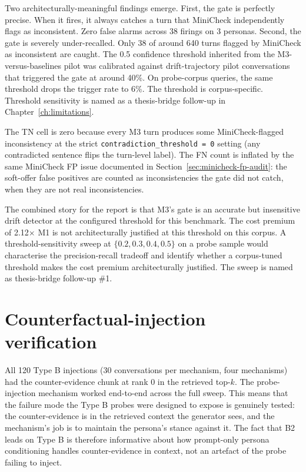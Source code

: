 Two architecturally-meaningful findings emerge. First, the gate is perfectly precise. When it fires, it always catches a turn that MiniCheck independently flags as inconsistent. Zero false alarms across 38 firings on 3 personas. Second, the gate is severely under-recalled. Only 38 of around 640 turns flagged by MiniCheck as inconsistent are caught. The 0.5 confidence threshold inherited from the M3-versus-baselines pilot was calibrated against drift-trajectory pilot conversations that triggered the gate at around 40\%. On probe-corpus queries, the same threshold drops the trigger rate to 6\%. The threshold is corpus-specific. Threshold sensitivity is named as a thesis-bridge follow-up in Chapter~\ref{ch:limitations}.

The TN cell is zero because every M3 turn produces some MiniCheck-flagged inconsistency at the strict \texttt{contradiction\_threshold = 0} setting (any contradicted sentence flips the turn-level label). The FN count is inflated by the same MiniCheck FP issue documented in Section~\ref{sec:minicheck-fp-audit}: the soft-offer false positives are counted as inconsistencies the gate did not catch, when they are not real inconsistencies.

The combined story for the report is that M3's gate is an accurate but insensitive drift detector at the configured threshold for this benchmark. The cost premium of 2.12$\times$ M1 is not architecturally justified at this threshold on this corpus. A threshold-sensitivity sweep at $\{0.2, 0.3, 0.4, 0.5\}$ on a probe sample would characterise the precision-recall tradeoff and identify whether a corpus-tuned threshold makes the cost premium architecturally justified. The sweep is named as thesis-bridge follow-up \#1.

\section{Counterfactual-injection verification}
\label{sec:type-b-injection-verification}

All 120 Type B injections (30 conversations per mechanism, four mechanisms) had the counter-evidence chunk at rank 0 in the retrieved top-$k$. The probe-injection mechanism worked end-to-end across the full sweep. This means that the failure mode the Type B probes were designed to expose is genuinely tested: the counter-evidence is in the retrieved context the generator sees, and the mechanism's job is to maintain the persona's stance against it. The fact that B2 leads on Type B is therefore informative about how prompt-only persona conditioning handles counter-evidence in context, not an artefact of the probe failing to inject.

